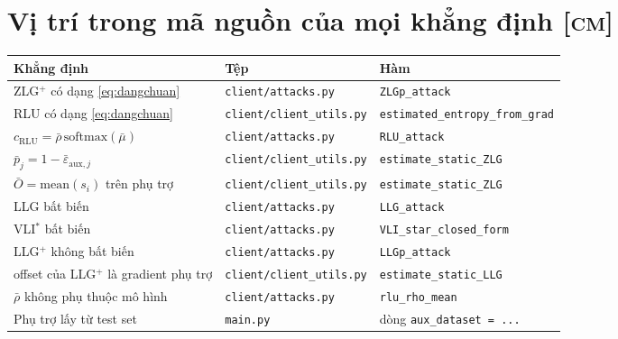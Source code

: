 \documentclass[11pt,a4paper]{article}
\theoremstyle{remark}
\newcommand{\code}[1]{\texttt{\small #1}}
\begin{document}
\appendix
\section{Vị trí trong mã nguồn của mọi khẳng định \textsc{[cm]}}

\begin{center}
\begin{tabular}{@{}lll@{}}
\toprule
\textbf{Khẳng định} & \textbf{Tệp} & \textbf{Hàm} \\
\midrule
ZLG$^+$ có dạng \eqref{eq:dangchuan} & \code{client/attacks.py} & \code{ZLGp\_attack} \\
RLU có dạng \eqref{eq:dangchuan} & \code{client/client\_utils.py} & \code{estimated\_entropy\_from\_grad} \\
$c_{\text{RLU}}=\bar\rho\,\mathrm{softmax}(\bar\mu)$ & \code{client/attacks.py} & \code{RLU\_attack} \\
$\bar p_j=1-\bar\varepsilon_{\mathrm{aux},j}$ & \code{client/client\_utils.py} & \code{estimate\_static\_ZLG} \\
$\bar O=\mathrm{mean}(s_i)$ trên phụ trợ & \code{client/client\_utils.py} & \code{estimate\_static\_ZLG} \\
LLG bất biến & \code{client/attacks.py} & \code{LLG\_attack} \\
VLI$^*$ bất biến & \code{client/attacks.py} & \code{VLI\_star\_closed\_form} \\
LLG$^+$ không bất biến & \code{client/attacks.py} & \code{LLGp\_attack} \\
offset của LLG$^+$ là gradient phụ trợ & \code{client/client\_utils.py} & \code{estimate\_static\_LLG} \\
$\bar\rho$ không phụ thuộc mô hình & \code{client/attacks.py} & \code{rlu\_rho\_mean} \\
Phụ trợ lấy từ test set & \code{main.py} & dòng \code{aux\_dataset = ...} \\
\bottomrule
\end{tabular}
\end{center}
\end{document}

